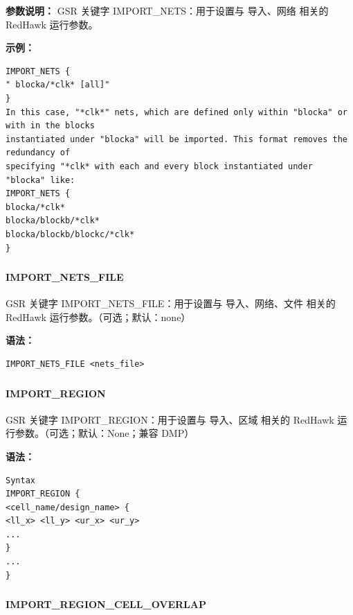\textbf{参数说明：}
GSR 关键字 IMPORT\_NETS：用于设置与 导入、网络 相关的 RedHawk 运行参数。

\textbf{示例：}
\begin{lstlisting}
IMPORT_NETS {
" blocka/*clk* [all]"
}
In this case, "*clk*" nets, which are defined only within "blocka" or with in the blocks
instantiated under "blocka" will be imported. This format removes the redundancy of
specifying "*clk* with each and every block instantiated under "blocka" like:
IMPORT_NETS {
blocka/*clk*
blocka/blockb/*clk*
blocka/blockb/blockc/*clk*
}
\end{lstlisting}

\subsubsection{}
\paragraph*{IMPORT_NETS_FILE}

GSR 关键字 IMPORT_NETS_FILE：用于设置与 导入、网络、文件 相关的 RedHawk 运行参数。（可选；默认：none）

\textbf{语法：}
\begin{lstlisting}
IMPORT_NETS_FILE <nets_file>
\end{lstlisting}

\subsubsection{}
\paragraph*{IMPORT_REGION}

GSR 关键字 IMPORT_REGION：用于设置与 导入、区域 相关的 RedHawk 运行参数。（可选；默认：None；兼容 DMP）

\textbf{语法：}
\begin{lstlisting}
Syntax
IMPORT_REGION {
<cell_name/design_name> {
<ll_x> <ll_y> <ur_x> <ur_y>
...
}
...
}
\end{lstlisting}

\subsubsection{}
\paragraph*{IMPORT_REGION_CELL_OVERLAP}

